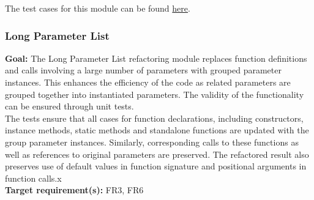 \documentclass[12pt, titlepage]{article}
\begin{document}
\noindent The test cases for this module can be found \href{https://github.com/ssm-lab/capstone--source-code-optimizer/blob/new-poc/tests/refactorers/test_repeated_calls.py}{here}.

\subsubsection{Long Parameter List}

\textbf{Goal:} The Long Parameter List refactoring module replaces function definitions and calls involving a large number of parameters with grouped parameter instances. This enhances the efficiency of the code as related parameters are grouped together into instantiated parameters. The validity of the functionality can be ensured through unit tests.\\

\noindent The tests ensure that all cases for function declarations, including constructors, instance methods, static methods and standalone functions are updated with the group parameter instances. Similarly, corresponding calls to these functions as well as references to original parameters are preserved. The refactored result also preserves use of default values in function signature and positional arguments in function calls.x\\

\noindent \textbf{Target requirement(s):} FR3, FR6~\cite{SRS} \\
\end{document}
